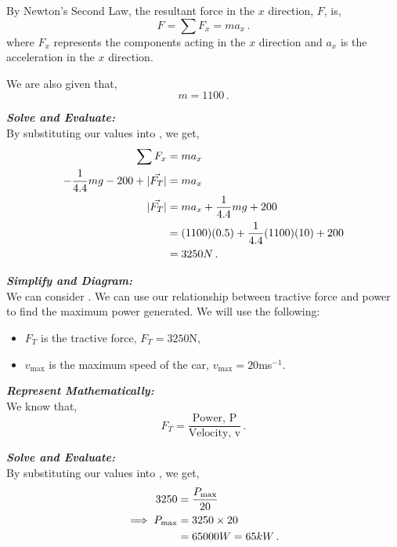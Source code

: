 \begin{subquestions}
\begin{subsubquestions}
By Newton's Second Law, the resultant force in the $x$ direction, $F$, is,
\begin{equation}
	F = \sum F_x = ma_x \,. \label{2011:q5:Newt1}
\end{equation}
where $F_x$ represents the components acting in the $x$ direction and $a_x$ is the acceleration in the $x$ direction.

We are also given that,
\begin{equation}
	m = 1100 \,.
\end{equation}



\textbf{\textit{Solve and Evaluate:}} \nn \\
By substituting our values into , we get,
\begin{align}
	\sum F_x & = ma_x \nonumber \\
	-\frac{1}{4.4}mg-200+|\vec{F_T}| & = ma_x \nonumber \\
	|\vec{F_T}| & = ma_x +\frac{1}{4.4}mg+200 \nonumber \\
	            & = (1100)(0.5)+\frac{1}{4.4}(1100)(10)+200 \nonumber \\
	            & = 3250N \,.
\end{align}


\subsubquestion

\textbf{\textit{Simplify and Diagram:}} \\
We can consider . We can use our relationship between tractive force and power to find the maximum power generated.
We will use the following:
\begin{itemize}
	\item $F_T$ is the tractive force, $F_T=3250$N,
	\item $v_\text{max}$ is the maximum speed of the car, $v_{\text{max}}=20$ms$^{-1}$.
\end{itemize}




\textbf{\textit{Represent Mathematically:}} \\
We know that,
\begin{equation}
	F_T  = \frac{\text{Power, P}}{\text{Velocity, v}} \,. \label{2011:q5:PEqn1} 
\end{equation}




\textbf{\textit{Solve and Evaluate:}} \\
By substituting our values into , we get,
\begin{align}
	3250 & = \frac{P_{\text{max}}}{20} \nonumber \\
	\implies P_{\text{max}} & = 3250 \times 20 \nonumber \\
	               & = 65000W = 65kW \,.
\end{align}
	

\end{subsubquestions}
\end{subquestions}
